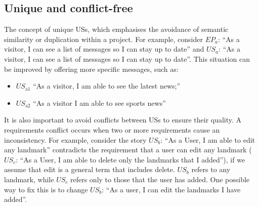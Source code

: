 \subsection*{\normalsize{Unique and conflict-free}}
The concept of unique USs, which emphasises the avoidance of semantic similarity or duplication within a project. For example, consider $EP_a$: \enquote{As a visitor, I can see a list of messages so I can stay up to date} and $US_a$: \enquote{As a visitor, I can see a list of messages so I can stay up to date}. This situation can be improved by offering more specific messages, such as:
\begin{itemize}
\item $US_{\text{a1}}$ \enquote{As a visitor, I am able to see the latest news;}
\item $US_{\text{a2}}$ \enquote{As a visitor I am able to see sports news}
\end{itemize}
It is also important to avoid conflicts between USs to ensure their quality. A requirements conflict occurs when two or more requirements cause an inconsistency\cite{paja2013managing,robinson1989integrating}. For example, consider the story $US_b$: \enquote{As a User, I am able to edit any landmark} contradicts the requirement that a user can edit any landmark ($US_c$: \enquote{As a User, I am able to delete only the landmarks that I added}), if we assume that edit is a general term that includes delete. $US_b$ refers to any landmark, while $US_c$ refers only to those that the user has added. One possible way to fix this is to change $US_b$: \enquote{As a user, I can edit the landmarks I have added}. \cite{lucassen2016improving}


